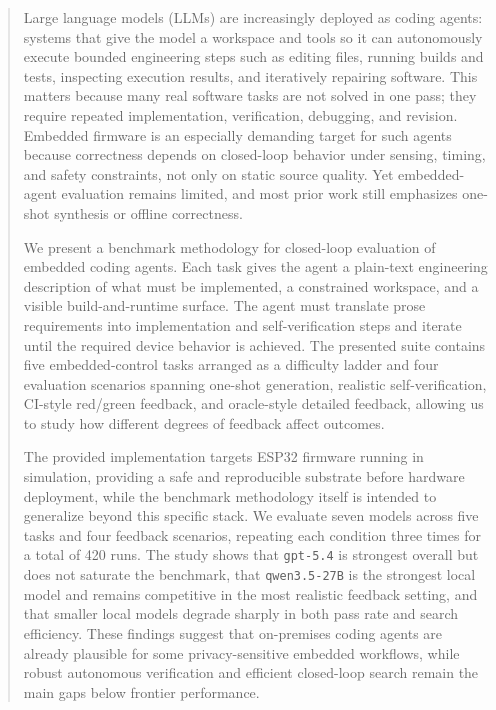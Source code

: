 \documentclass[a4paper,fleqn]{cas-dc}
\DeclareRobustCommand{\tool}[1]{\texttt{\nolinkurl{#1}}}
\begin{document}
\begin{abstract}
Large language models (LLMs) are increasingly deployed as coding agents: systems that give the model a workspace and tools so it can autonomously execute bounded engineering steps such as editing files, running builds and tests, inspecting execution results, and iteratively repairing software. This matters because many real software tasks are not solved in one pass; they require repeated implementation, verification, debugging, and revision. Embedded firmware is an especially demanding target for such agents because correctness depends on closed-loop behavior under sensing, timing, and safety constraints, not only on static source quality. Yet embedded-agent evaluation remains limited, and most prior work still emphasizes one-shot synthesis or offline correctness.

We present a benchmark methodology for closed-loop evaluation of embedded coding agents. Each task gives the agent a plain-text engineering description of what must be implemented, a constrained workspace, and a visible build-and-runtime surface. The agent must translate prose requirements into implementation and self-verification steps and iterate until the required device behavior is achieved. The presented suite contains five embedded-control tasks arranged as a difficulty ladder and four evaluation scenarios spanning one-shot generation, realistic self-verification, CI-style red/green feedback, and oracle-style detailed feedback, allowing us to study how different degrees of feedback affect outcomes.

The provided implementation targets ESP32 firmware running in simulation, providing a safe and reproducible substrate before hardware deployment, while the benchmark methodology itself is intended to generalize beyond this specific stack. We evaluate seven models across five tasks and four feedback scenarios, repeating each condition three times for a total of 420 runs. The study shows that \tool{gpt-5.4} is strongest overall but does not saturate the benchmark, that \tool{qwen3.5-27B} is the strongest local model and remains competitive in the most realistic feedback setting, and that smaller local models degrade sharply in both pass rate and search efficiency. These findings suggest that on-premises coding agents are already plausible for some privacy-sensitive embedded workflows, while robust autonomous verification and efficient closed-loop search remain the main gaps below frontier performance.
\end{abstract}
\end{document}
